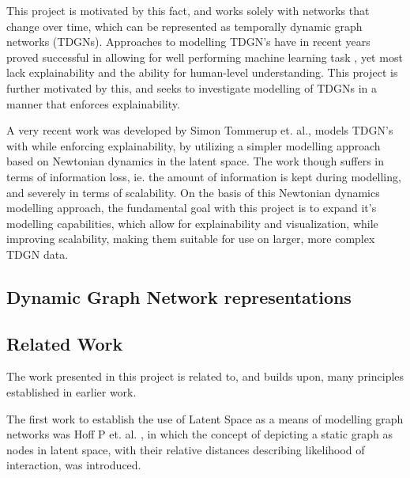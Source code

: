 This project is motivated by this fact, and works solely with networks that change over time, which can be represented as temporally dynamic graph networks (TDGNs).
Approaches to modelling TDGN's have in recent years proved successful in allowing for well performing machine learning task
, yet most lack explainability and the ability for human-level understanding.
This project is further motivated by this, and seeks to investigate modelling of TDGNs in a manner that enforces explainability. 

A very recent work was developed by Simon Tommerup et. al., models TDGN's with while enforcing explainability, by utilizing a simpler modelling approach based on Newtonian dynamics in the latent space.
The work though suffers in terms of information loss, ie. the amount of information is kept during modelling, and severely in terms of scalability.
On the basis of this Newtonian dynamics modelling approach, the fundamental goal with this project is to expand it's modelling capabilities, which allow for explainability and visualization, while improving scalability, making them suitable for use on larger, more complex TDGN data.



\subsection{Dynamic Graph Network representations}
\label{sec:Intro:DynamicGraphNetworks}




\subsection{Related Work}
\label{sec:Intro:RelatedWork}
The work presented in this project is related to, and builds upon, many principles established in earlier work.

The first work to establish the use of Latent Space as a means of modelling graph networks was Hoff P et. al. \cite{Hoff2002LatentAnalysis}, in which the concept of depicting a static graph as nodes in latent space, with their relative distances describing likelihood of interaction, was introduced.

